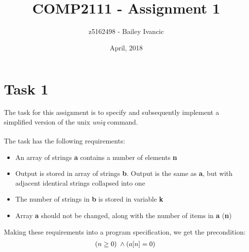 \documentclass [a4paper, 12pt, fleqn]  {article}
\title{COMP2111 - Assignment 1}
\author{z5162498 - Bailey Ivancic}
\date{April, 2018}
\begin{document}
\maketitle
\section{Task 1}
\label{sec:task-1}

The task for this assignment is to specify and subsequently implement a simplified version of the unix \textit{uniq} command.
\\~\\
The task has the following requirements:
\begin{itemize}
	\item An array of strings \textbf{a} contains a number of elements \textbf{n}
	\item Output is stored in array of strings \textbf{b}. Output is the same as \textbf{a}, but with adjacent identical strings collapsed into one
	\item The number of strings in \textbf{b} is stored in variable \textbf{k}
	\item Array \textbf{a} should not be changed, along with the number of items in \textbf{a} (\textbf{n})
\end{itemize}

Making these requirements into a program specification, we get the precondition:
\begin{gather*}
  (n \geq 0) \hspace{0.1cm} \wedge
  (a[n] = 0) \hspace{0.1cm} \\
\end{gather*}

\end{document}
